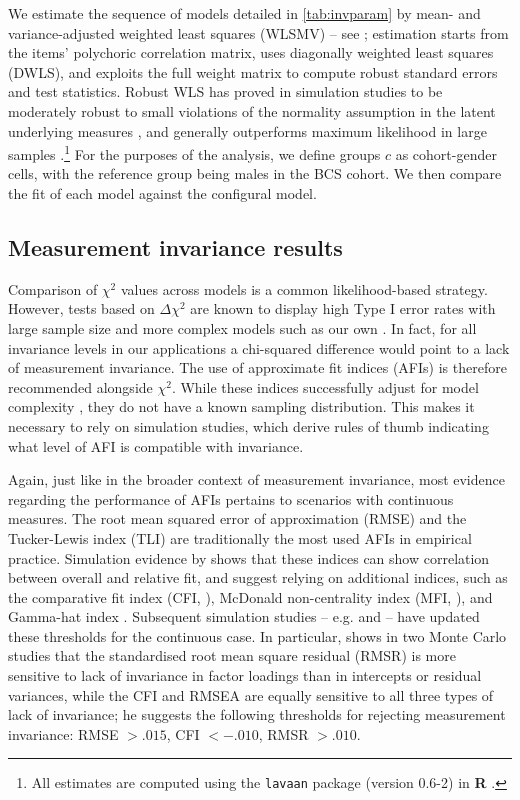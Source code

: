 We estimate the sequence of models detailed in \autoref{tab:invparam} by mean- and variance-adjusted weighted least squares (WLSMV) -- see \citet{Muthen1997}; estimation starts from the items' polychoric correlation matrix, uses diagonally weighted least squares (DWLS), and exploits the full weight matrix to compute robust standard errors and test statistics. Robust WLS has proved in simulation studies to be moderately robust to small violations of the normality assumption in the latent underlying measures \citep{Flora2004}, and generally outperforms maximum likelihood in large samples \citep{Beauducel2006,Li2016}.\footnote{All estimates are computed using the \texttt{lavaan} package (version 0.6-2) in \textbf{\textsf{R}} \citep{Rosseel2012}.}
For the purposes of the analysis, we define groups $c$ as cohort-gender cells, with the reference group being males in the BCS cohort. We then compare the fit of each model against the configural model.

\subsection{Measurement invariance results \label{sec:mires}}

Comparison of $\chi^2$ values across models is a common likelihood-based strategy. However, tests based on $\Delta \chi^2$ are known to display high Type I error rates with large sample size and more complex models such as our own \citep{Sass2014}. In fact, for all invariance levels in our applications a chi-squared difference would point to a lack of measurement invariance. The use of approximate fit indices (AFIs) is therefore recommended alongside $\chi^2$. While these indices successfully adjust for model complexity \citep{Cheung2002}, they do not have a known sampling distribution. This makes it necessary to rely on simulation studies, which derive rules of thumb indicating what level of \textDelta AFI is compatible with invariance.

Again, just like in the broader context of measurement invariance, most evidence regarding the performance of AFIs pertains to scenarios with continuous measures. The root mean squared error of approximation (RMSE) and the Tucker-Lewis index (TLI) are traditionally the most used AFIs in empirical practice. Simulation evidence by \citet{Cheung2002} shows that these indices can show correlation between overall and relative fit, and suggest relying on additional indices, such as the comparative fit index (CFI, \citealp{Bentler1990}), McDonald non-centrality index (MFI, \citealp{McDonald1989}), and Gamma-hat index \citep{Steiger1989}. Subsequent simulation studies -- e.g. \citet{Chen2007} and \citet{Meade2008} -- have updated these thresholds for the continuous case. In particular, \citet{Chen2007} shows in two Monte Carlo studies that the standardised root mean square residual (RMSR) is more sensitive to lack of invariance in factor loadings than in intercepts or residual variances, while the CFI and RMSEA are equally sensitive to all three types of lack of invariance; he suggests the following thresholds for rejecting measurement invariance: \textDelta RMSE $> .015$, \textDelta CFI $< - .010$, \textDelta RMSR $> .010$. 


